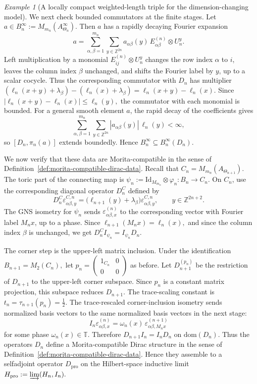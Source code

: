\documentclass[11pt]{amsart}
\theoremstyle{definition}
\theoremstyle{remark}
\newtheorem{example}[theorem]{Example}
\newcommand{\T}{\mathbb{T}}
\newcommand{\Z}{\mathbb{Z}}
\newcommand{\id}{\mathrm{Id}}
\newcommand{\ex}{\mathrm{pro}}
\newcommand{\dom}{\mathrm{dom}}
\begin{document}
\begin{example}[A locally compact weighted-length triple for the dimension-changing model]
We next check bounded commutators at the finite stages. Let
$a\in B_n^\infty:=M_{m_n}(A_{\Theta_n}^\infty)$. Then $a$ has a rapidly decaying Fourier expansion
\[
a=
\sum_{\alpha,\beta=1}^{m_n}
\sum_{y\in\Z^{2n}}
a_{\alpha\beta}(y)\,
E_{\alpha\beta}^{(n)}\otimes U_n^y.
\]
Left multiplication by a monomial $E_{ij}^{(n)}\otimes U_n^y$
changes the row index $\alpha$ to $i$, leaves the column index $\beta$
unchanged, and shifts the Fourier label by $y$, up to a scalar cocycle. Thus
the corresponding commutator with $D_n$ has multiplier
$(\ell_n(x+y)+\lambda_\beta)-(\ell_n(x)+\lambda_\beta)=\ell_n(x+y)-\ell_n(x).$
Since
$|\ell_n(x+y)-\ell_n(x)|\leq \ell_n(y),$
the commutator with each monomial is bounded. For a general smooth element
$a$, the rapid decay of the coefficients gives
\[
\sum_{\alpha,\beta=1}^{m_n}
\sum_{y\in\Z^{2n}}
|a_{\alpha\beta}(y)|\,\ell_n(y)<\infty,
\]
so $[D_n,\pi_n(a)]$ extends boundedly. Hence $B_n^\infty\subseteq B_n^\infty(D_n).$

We now verify that these data are Morita-compatible in the sense of
Definition~\ref{def:morita-compatible-dirac-data}. 
Recall that $C_n=M_{m_n}(A_{\Theta_{n+1}})$.
The toric part of the connecting map is $\psi_n:=\id_{M_{m_n}}\otimes\varphi_n\colon B_n\to C_n.$
On $C_n$, use the corresponding diagonal operator $D_n^C$ defined by
\[
D_n^C\varepsilon_{\alpha\beta,y}^{C,n}
=
\bigl(\ell_{n+1}(y)+\lambda_\beta\bigr)
\varepsilon_{\alpha\beta,y}^{C,n},
\qquad
y\in\Z^{2n+2}.
\]
The GNS isometry for $\psi_n$ sends $\varepsilon_{\alpha\beta,x}^{(n)}$
to the corresponding vector with Fourier label $M_nx$, up to a phase. Since $\ell_{n+1}(M_nx)=\ell_n(x),$
and since the column index $\beta$ is unchanged, we get $D_n^C I_{\psi_n}=I_{\psi_n}D_n.$

The corner step is the upper-left matrix inclusion. Under the identification $B_{n+1}=M_2(C_n),$
let $p_n=
\begin{pmatrix}
1_{C_n}&0\\
0&0
\end{pmatrix}$ as before. Let $D_{n+1}^{(p_n)}$ be the restriction of $D_{n+1}$ to the upper-left
corner subspace. Since $p_n$ is a constant matrix projection, this subspace
reduces $D_{n+1}$. The trace-scaling constant is $t_n=\tau_{n+1}(p_n)=\frac12.$ The trace-rescaled corner-inclusion isometry sends normalized basis vectors to the same normalized basis vectors in the next stage:
\[
I_n\varepsilon_{\alpha\beta,x}^{(n)}
=
\omega_n(x)\,
\varepsilon_{\alpha\beta,M_nx}^{(n+1)}
\]
for some phase $\omega_n(x)\in\T$. Therefore $D_{n+1}I_n=I_nD_n$
on $\dom(D_n)$. Thus the operators $D_n$ define a Morita-compatible Dirac structure in the
sense of Definition~\ref{def:morita-compatible-dirac-data}.
Hence they assemble to a selfadjoint
operator $D_{\ex}$
on the Hilbert-space inductive limit $H_{\ex}:=\varinjlim(H_n,I_n).$


\end{example}
\end{document}
